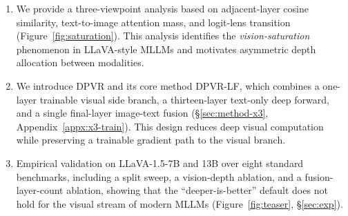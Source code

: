 \documentclass[a4paper,fleqn,review]{cas-sc}
\newcommand{\dpvr}{DPVR}
\newcommand{\dpvrlf}{DPVR-LF}
\begin{document}
\begin{enumerate}
\item We provide a three-viewpoint analysis based on adjacent-layer
cosine similarity, text-to-image attention mass, and logit-lens
transition (Figure~\ref{fig:saturation}). This analysis identifies
the \emph{vision-saturation} phenomenon in LLaVA-style MLLMs and
motivates asymmetric depth allocation between modalities.

\item We introduce \dpvr{} and its core method \dpvrlf{}, which
combines a one-layer trainable visual side branch, a thirteen-layer
text-only deep forward, and a single final-layer image-text fusion
(\S\ref{sec:method-x3}, Appendix~\ref{appx:x3-train}). This design
reduces deep visual computation while preserving a trainable
gradient path to the visual branch.

\item Empirical validation on LLaVA-1.5-7B and 13B over eight
standard benchmarks, including a split sweep, a vision-depth
ablation, and a fusion-layer-count ablation, showing that the
``deeper-is-better'' default does not hold for the visual stream of
modern MLLMs (Figure~\ref{fig:teaser}, \S\ref{sec:exp}).


\end{enumerate}
\end{document}
